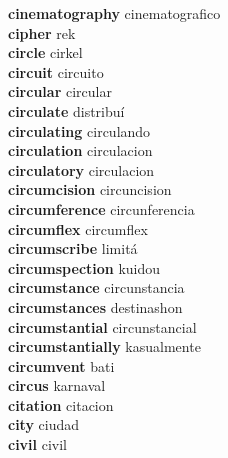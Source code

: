 \textbf{cinematography } cinematografico \\
\textbf{cipher } rek \\
\textbf{circle } cirkel \\
\textbf{circuit } circuito \\
\textbf{circular } circular \\
\textbf{circulate } distribuí \\
\textbf{circulating } circulando \\
\textbf{circulation } circulacion \\
\textbf{circulatory } circulacion \\
\textbf{circumcision } circuncision \\
\textbf{circumference } circunferencia \\
\textbf{circumflex } circumflex \\
\textbf{circumscribe } limitá \\
\textbf{circumspection } kuidou \\
\textbf{circumstance } circunstancia \\
\textbf{circumstances } destinashon \\
\textbf{circumstantial } circunstancial \\
\textbf{circumstantially } kasualmente \\
\textbf{circumvent } bati \\
\textbf{circus } karnaval \\
\textbf{citation } citacion \\
\textbf{city } ciudad \\
\textbf{civil } civil \\
